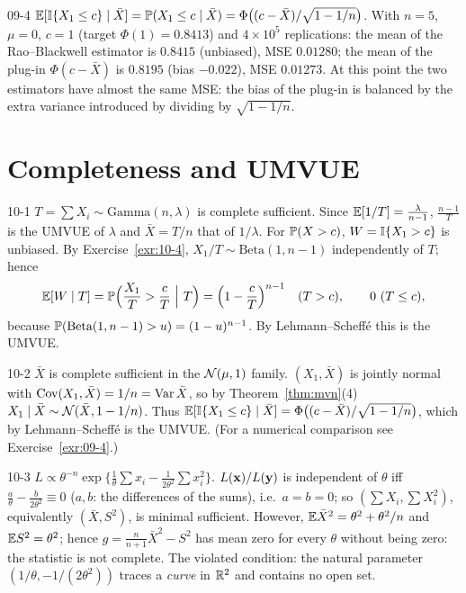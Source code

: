 \begin{solution}{09-4}
$\E[\I\{X_1\le c\}\mid\bar X]=\P(X_1\le c\mid\bar X)=\Phi\big((c-\bar X)/\sqrt{1-1/n}\big)$. With $n=5$, $\mu=0$, $c=1$ (target $\Phi(1)=0.8413$) and $4\times10^5$ replications: the mean of the Rao--Blackwell estimator is $0.8415$ (unbiased), MSE $0.01280$; the mean of the plug-in $\Phi(c-\bar X)$ is $0.8195$ (bias $-0.022$), MSE $0.01273$. At this point the two estimators have almost the same MSE: the bias of the plug-in is balanced by the extra variance introduced by dividing by $\sqrt{1-1/n}$.
\end{solution}

\section{Completeness and UMVUE}

\begin{solution}{10-1}
$T=\sum X_i\sim\text{Gamma}(n,\lambda)$ is complete sufficient. Since $\E[1/T]=\frac{\lambda}{n-1}$, $\frac{n-1}{T}$ is the UMVUE of $\lambda$ and $\bar X=T/n$ that of $1/\lambda$. For $\P(X>c)$, $W=\I\{X_1>c\}$ is unbiased. By Exercise~\ref{exr:10-4}, $X_1/T\sim\text{Beta}(1,n-1)$ independently of $T$; hence
\[
\E[W\mid T]=\P\Big(\frac{X_1}{T}>\frac cT\ \Big|\ T\Big)=\Big(1-\frac cT\Big)^{n-1}\quad(T>c),\qquad 0\ (T\le c),
\]
because $\P(\text{Beta}(1,n-1)>u)=(1-u)^{n-1}$. By Lehmann--Scheffé this is the UMVUE.
\end{solution}

\begin{solution}{10-2}
$\bar X$ is complete sufficient in the $\Normal(\mu,1)$ family. $(X_1,\bar X)$ is jointly normal with $\Cov(X_1,\bar X)=1/n=\Var\bar X$, so by Theorem~\ref{thm:mvn}(4) $X_1\mid\bar X\sim\Normal(\bar X,1-1/n)$. Thus $\E[\I\{X_1\le c\}\mid\bar X]=\Phi\big((c-\bar X)/\sqrt{1-1/n}\big)$, which by Lehmann--Scheffé is the UMVUE. (For a numerical comparison see Exercise~\ref{exr:09-4}.)
\end{solution}

\begin{solution}{10-3}
$L\propto\theta^{-n}\exp\{\frac1\theta\sum x_i-\frac{1}{2\theta^2}\sum x_i^2\}$. $L(\x)/L(\mathbf y)$ is independent of $\theta$ iff $\frac a\theta-\frac{b}{2\theta^2}\equiv0$ ($a,b$: the differences of the sums), i.e.\ $a=b=0$; so $(\sum X_i,\sum X_i^2)$, equivalently $(\bar X,S^2)$, is minimal sufficient. However, $\E\bar X^2=\theta^2+\theta^2/n$ and $\E S^2=\theta^2$; hence $g=\frac{n}{n+1}\bar X^2-S^2$ has mean zero for every $\theta$ without being zero: the statistic is not complete. The violated condition: the natural parameter $(1/\theta,-1/(2\theta^2))$ traces a \emph{curve} in $\R^2$ and contains no open set.
\end{solution}

